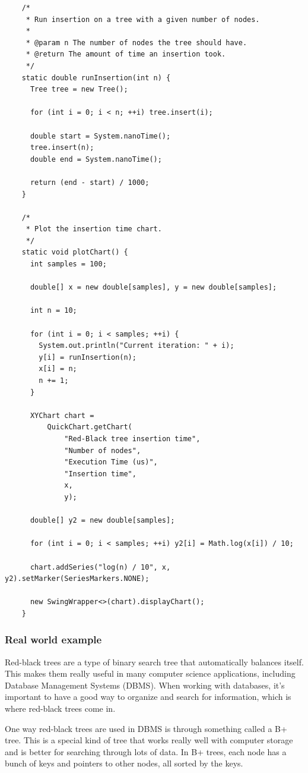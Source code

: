 \documentclass[10pt]{article}
\begin{document}
  \begin{verbatim}
    /*
     * Run insertion on a tree with a given number of nodes.
     *
     * @param n The number of nodes the tree should have.
     * @return The amount of time an insertion took.
     */
    static double runInsertion(int n) {
      Tree tree = new Tree();

      for (int i = 0; i < n; ++i) tree.insert(i);

      double start = System.nanoTime();
      tree.insert(n);
      double end = System.nanoTime();

      return (end - start) / 1000;
    }

    /*
     * Plot the insertion time chart.
     */
    static void plotChart() {
      int samples = 100;

      double[] x = new double[samples], y = new double[samples];

      int n = 10;

      for (int i = 0; i < samples; ++i) {
        System.out.println("Current iteration: " + i);
        y[i] = runInsertion(n);
        x[i] = n;
        n += 1;
      }

      XYChart chart =
          QuickChart.getChart(
              "Red-Black tree insertion time",
              "Number of nodes",
              "Execution Time (us)",
              "Insertion time",
              x,
              y);

      double[] y2 = new double[samples];

      for (int i = 0; i < samples; ++i) y2[i] = Math.log(x[i]) / 10;

      chart.addSeries("log(n) / 10", x, y2).setMarker(SeriesMarkers.NONE);

      new SwingWrapper<>(chart).displayChart();
    }
  \end{verbatim}

  \subsubsection*{Real world example}


  Red-black trees are a type of binary search tree that automatically balances
  itself. This makes them really useful in many computer science applications,
  including Database Management Systems (DBMS). When working with databases, it's
  important to have a good way to organize and search for information, which is where
  red-black trees come in.

  \spacing
  \noindent
  One way red-black trees are used in DBMS is through something called a B+ tree.
  This is a special kind of tree that works really well with computer storage and
  is better for searching through lots of data. In B+ trees, each node has a
  bunch of keys and pointers to other nodes, all sorted by the keys.
\end{document}
